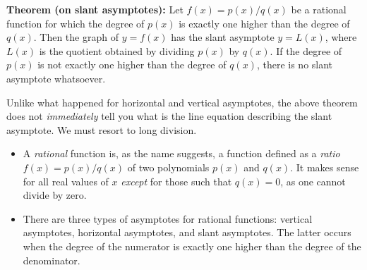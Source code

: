 \documentclass{ximera}
\begin{document}
\begin{callout}
  {\bf Theorem (on slant asymptotes):} Let $f(x) = p(x)/q(x)$ be a rational function for which the degree of $p(x)$ is exactly one higher than the degree of $q(x)$. Then the graph of $y=f(x)$ has the slant asymptote $y=L(x)$, where $L(x)$ is the quotient obtained by dividing $p(x)$ by $q(x)$. If the degree of $p(x)$ is not exactly one higher than the degree of $q(x)$, there is no slant asymptote whatsoever.
\end{callout}

  Unlike what happened for horizontal and vertical asymptotes, the above theorem does not \emph{immediately} tell you what is the line equation describing the slant asymptote. We must resort to long division.


\begin{summary}\begin{itemize}
\item A \emph{rational} function is, as the name suggests, a function defined as a \emph{ratio} $f(x) = p(x)/q(x)$ of two polynomials $p(x)$ and $q(x)$. It makes sense for all real values of $x$ \emph{except} for those such that $q(x) = 0$, as one cannot divide by zero.
\item There are three types of asymptotes for rational functions: vertical asymptotes, horizontal asymptotes, and slant asymptotes. The latter occurs when the degree of the numerator is exactly one higher than the degree of the denominator.
\end{itemize}\end{summary}
\end{document}
